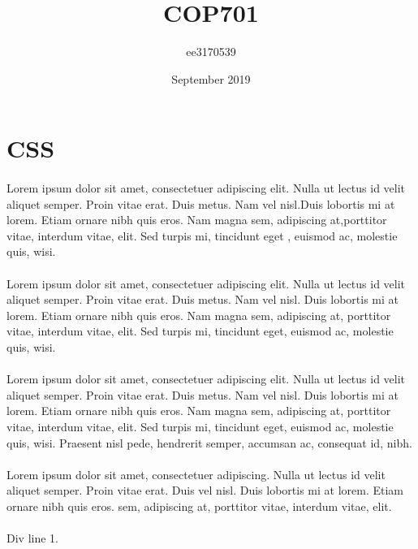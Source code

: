 \documentclass{article}
\title{COP701}
\author{ee3170539}
\date{September 2019}
\begin{document}
\maketitle

\section*{CSS }
\paragraph{}Lorem ipsum dolor sit amet, consectetuer adipiscing elit. Nulla ut lectus id velit aliquet semper. Proin vitae erat. Duis metus. Nam vel nisl.Duis lobortis mi at lorem. Etiam ornare nibh quis eros. Nam magna sem, adipiscing at,porttitor vitae, interdum vitae, elit. Sed turpis mi, tincidunt eget , euismod ac, molestie quis, wisi.   \paragraph{}Lorem ipsum dolor sit amet, consectetuer adipiscing elit. Nulla ut lectus id velit aliquet semper. Proin vitae erat. Duis metus. Nam vel nisl. Duis lobortis mi at lorem. Etiam ornare nibh quis eros. Nam magna sem, adipiscing at, porttitor vitae, interdum vitae, elit. Sed turpis mi, tincidunt eget, euismod ac, molestie quis, wisi.   \paragraph{}Lorem ipsum dolor sit amet, consectetuer adipiscing elit. Nulla ut lectus id velit aliquet semper. Proin vitae erat. Duis metus. Nam vel nisl. Duis lobortis mi at lorem. Etiam ornare nibh quis eros. Nam magna sem, adipiscing at, porttitor vitae, interdum vitae, elit. Sed turpis mi, tincidunt eget, euismod ac, molestie quis, wisi. Praesent nisl pede, hendrerit semper, accumsan ac, consequat id, nibh. \paragraph{}Lorem ipsum dolor sit amet, consectetuer adipiscing. Nulla ut lectus id velit aliquet semper. Proin vitae erat. Duis vel nisl. Duis lobortis mi at lorem. Etiam ornare nibh quis eros. sem, adipiscing at, porttitor vitae, interdum vitae, elit. \newline
\paragraph{}Div line 1.  \newline
\newline
\end{document}
